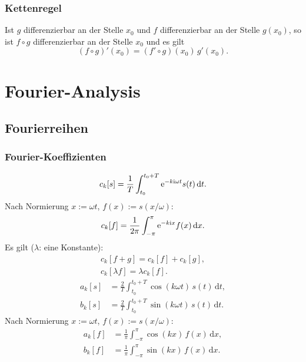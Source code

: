 \subsubsection{Kettenregel}
Ist $g$ differenzierbar an der Stelle $x_0$ und
$f$ differenzierbar an der Stelle $g(x_0)$, so ist $f\circ g$
differenzierbar an der Stelle $x_0$ und es gilt
\begin{equation}
(f\circ g)'(x_0) = (f'\circ g)(x_0)\, g'(x_0).
\end{equation}

\section{Fourier-Analysis}
\subsection{Fourierreihen}
\subsubsection{Fourier-Koeffizienten}
\begin{equation}
c_k[s] = \frac{1}{T}\int_{t_0}^{t_0+T} \mathrm e^{-k\mathrm i\omega t}s(t)\,\mathrm dt.
\end{equation}
Nach Normierung $x:=\omega t$, $f(x):=s(x/\omega)$:
\begin{equation}
c_k[f] = \frac{1}{2\pi}\int_{-\pi}^{\pi} \mathrm e^{-k\mathrm i x}f(x)\,\mathrm dx.
\end{equation}
Es gilt ($\lambda$: eine Konstante):
\begin{gather}
c_k[f+g] = c_k[f]+c_k[g],\\
c_k[\lambda f] = \lambda c_k[f].
\end{gather}
\begin{align}
a_k[s] &= \frac{2}{T}\int_{t_0}^{t_0+T} \cos(k\omega t)\,s(t)\,\mathrm dt,\\
b_k[s] &= \frac{2}{T}\int_{t_0}^{t_0+T} \sin(k\omega t)\,s(t)\,\mathrm dt.
\end{align}
Nach Normierung $x:=\omega t$, $f(x):=s(x/\omega)$:
\begin{align}
a_k[f] &= \frac{1}{\pi}\int_{-\pi}^{\pi} \cos(kx)\,f(x)\,\mathrm dx,\\
b_k[f] &= \frac{1}{\pi}\int_{-\pi}^{\pi} \sin(kx)\,f(x)\,\mathrm dx.
\end{align}

